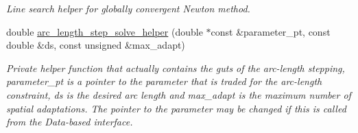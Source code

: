\begin{DoxyCompactItemize}
\begin{DoxyCompactList}\small\item\em Line search helper for globally convergent Newton method. \end{DoxyCompactList}\item 
double \hyperlink{classoomph_1_1Problem_afaa9689a9c73bb76caea5d24980e6788}{arc\+\_\+length\+\_\+step\+\_\+solve\+\_\+helper} (double $\ast$const \&parameter\+\_\+pt, const double \&ds, const unsigned \&max\+\_\+adapt)
\begin{DoxyCompactList}\small\item\em Private helper function that actually contains the guts of the arc-\/length stepping, parameter\+\_\+pt is a pointer to the parameter that is traded for the arc-\/length constraint, ds is the desired arc length and max\+\_\+adapt is the maximum number of spatial adaptations. The pointer to the parameter may be changed if this is called from the Data-\/based interface. \end{DoxyCompactList}\end{DoxyCompactItemize}
